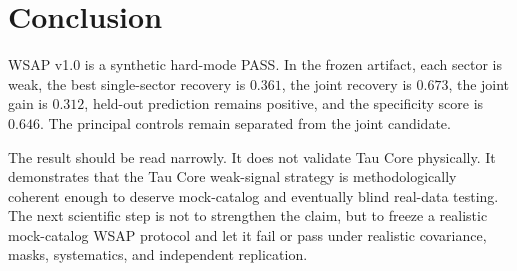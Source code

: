 \documentclass[12pt]{article}
\begin{document}
\section{Conclusion}

WSAP v1.0 is a synthetic hard-mode PASS.  In the frozen artifact, each sector
is weak, the best single-sector recovery is \(0.361\), the joint recovery is
\(0.673\), the joint gain is \(0.312\), held-out prediction remains positive,
and the specificity score is \(0.646\).  The principal controls remain
separated from the joint candidate.

The result should be read narrowly.  It does not validate Tau Core physically.
It demonstrates that the Tau Core weak-signal strategy is methodologically
coherent enough to deserve mock-catalog and eventually blind real-data testing.
The next scientific step is not to strengthen the claim, but to freeze a
realistic mock-catalog WSAP protocol and let it fail or pass under realistic
covariance, masks, systematics, and independent replication.



\end{document}
